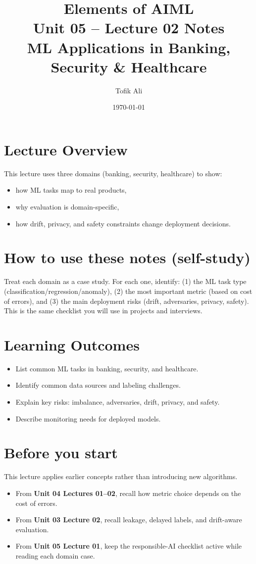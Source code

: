 \documentclass[11pt]{article}
\title{Elements of AIML\\Unit 05 -- Lecture 02 Notes\\ML Applications in Banking, Security \& Healthcare}
\author{Tofik Ali}
\date{\today}
\begin{document}
\maketitle
\tableofcontents

\section{Lecture Overview}
This lecture uses three domains (banking, security, healthcare) to show:
\begin{itemize}[leftmargin=*]
  \item how ML tasks map to real products,
  \item why evaluation is domain-specific,
  \item how drift, privacy, and safety constraints change deployment decisions.
\end{itemize}
\notesources{\AIMLUnitVSources}

\section{How to use these notes (self-study)}
Treat each domain as a case study.
For each one, identify: (1) the ML task type (classification/regression/anomaly), (2) the most important metric (based on cost of errors), and (3) the main deployment risks (drift, adversaries, privacy, safety).
This is the same checklist you will use in projects and interviews.

\section{Learning Outcomes}
\begin{itemize}[leftmargin=*]
  \item List common ML tasks in banking, security, and healthcare.
  \item Identify common data sources and labeling challenges.
  \item Explain key risks: imbalance, adversaries, drift, privacy, and safety.
  \item Describe monitoring needs for deployed models.
\end{itemize}

\section{Before you start}
This lecture applies earlier concepts rather than introducing new algorithms.
\begin{itemize}[leftmargin=*]
  \item From \textbf{Unit 04 Lectures 01--02}, recall how metric choice depends on the cost of errors.
  \item From \textbf{Unit 03 Lecture 02}, recall leakage, delayed labels, and drift-aware evaluation.
  \item From \textbf{Unit 05 Lecture 01}, keep the responsible-AI checklist active while reading each domain case.
\end{itemize}
\end{document}
